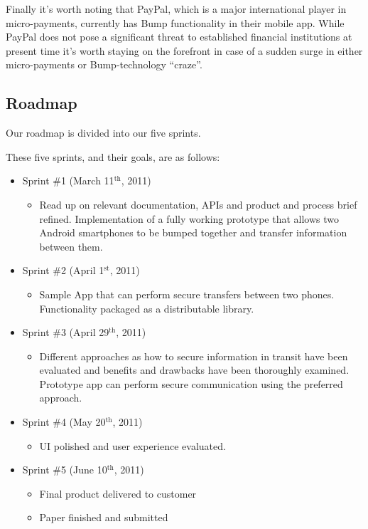 \documentclass[a4paper,11pt]{article}
\begin{document}
Finally it's worth noting that PayPal, which is a major international player in micro-payments, currently has Bump functionality in their mobile app. While PayPal does not pose a significant threat to established financial institutions at present time it's worth staying on the forefront in case of a sudden surge in either micro-payments or Bump-technology ``craze''.


\subsection{Roadmap} %
\label{subsec:roadmap}
Our roadmap is divided into our five sprints.

These five sprints, and their goals, are as follows:
\begin{itemize}
	\item Sprint \#1 (March 11$^{\text{th}}$, 2011)
	\begin{itemize}
		\item Read up on relevant documentation, APIs and product and process brief refined. Implementation of a fully working prototype that allows two Android smartphones to be bumped together and transfer information between them.
	\end{itemize}
\pagebreak
	\item Sprint \#2 (April 1$^{\text{st}}$, 2011)
	\begin{itemize}
		\item Sample App that can perform secure transfers between two phones. Functionality packaged as a distributable library.
	\end{itemize}
	
	\item Sprint \#3 (April 29$^{\text{th}}$, 2011)
	\begin{itemize}
		\item Different approaches as how to secure information in transit have been evaluated and benefits and drawbacks have been thoroughly examined. Prototype app can perform secure communication using the preferred approach.
	\end{itemize}
	
	\item Sprint \#4 (May 20$^{\text{th}}$, 2011)
	\begin{itemize}
		\item UI polished and user experience evaluated.
	\end{itemize}
	
	\item Sprint \#5 (June 10$^{\text{th}}$, 2011)
	\begin{itemize}
		\item Final product delivered to customer
		\item Paper finished and submitted
	\end{itemize}
\end{itemize}
\end{document}

